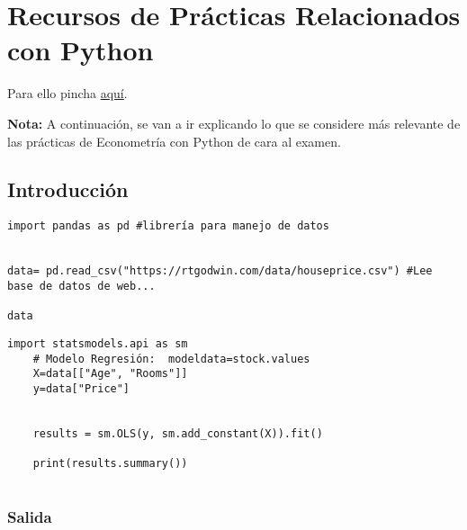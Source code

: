 \documentclass[a4paper,12pt]{article}
\begin{document}
\section{Recursos de Prácticas Relacionados con Python}

Para ello pincha \href{https://github.com/ElblogdeIsmael/ElblogdeIsmael.github.io/tree/main/Asignaturas/Tercer%20A%C3%B1o/ECO/Practicas/Python/econometria-main}{aquí}.

\begin{tcolorbox}[colback=blue!5!white,colframe=blue!75!black, title=Recursos de Prácticas en Econometría con Python]
    \textbf{Nota:} A continuación, se van a ir explicando lo que se considere más relevante de las prácticas de Econometría con Python de cara al examen.
    
\end{tcolorbox}

\subsection{Introducción}


\begin{lstlisting}[style = custompython, caption={Importación de librerías}]
import pandas as pd #librería para manejo de datos


data= pd.read_csv("https://rtgodwin.com/data/houseprice.csv") #Lee base de datos de web...

data
\end{lstlisting}

\begin{lstlisting}[style = custompython, caption={Modelo de Regresión Lineal}]
    import statsmodels.api as sm
    # Modelo Regresión:  modeldata=stock.values
    X=data[["Age", "Rooms"]]
    y=data["Price"]
    
    
    results = sm.OLS(y, sm.add_constant(X)).fit()
    
    print(results.summary())


\end{lstlisting}
\newpage
\subsubsection{Salida}
\end{document}
